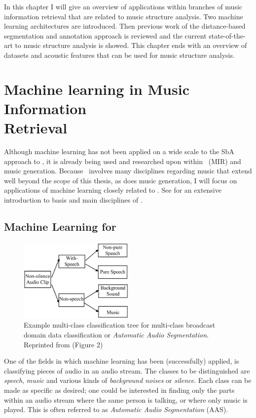 In this chapter I will give an overview of applications within branches of music information retrieval that are related to music structure analysis. Two machine learning architectures are introduced. Then previous work of the distance-based segmentation and annotation approach is reviewed and the current state-of-the-art to music structure analysis is showed. This chapter ends with an overview of datasets and acoustic features that can be used for music structure analysis. 


\section[ML in MIR]{Machine learning in Music Information\\Retrieval}
Although machine learning has not been applied on a wide scale to the SbA approach to \msa, it is already being used and researched upon within \mir\ (MIR) and music generation. Because \mir\ involves many disciplines regarding music that extend well beyond the scope of this thesis, as does music generation, I will focus on applications of machine learning closely related to \msa. See  \cite{Muller} for an extensive introduction to basis and main disciplines of \mir.

\subsection[ML for AAS]{Machine Learning for \aas}
\begin{figure}[t]
    \centering
    \includegraphics[width=0.5\textwidth]{images/broadcast_classification}
    \caption{Example multi-class classification tree for multi-class broadcast domain data classification or \textit{Automatic Audio Segmentation}.\\
    Reprinted from \textcite{Lu2001content} (Figure 2)}
    \label{fig:broadcast_classification}
\end{figure}
One of the fields in which machine learning has been (successfully) applied, is classifying pieces of audio in an audio stream. The classes to be distinguished are \textit{speech}, \textit{music} and various kinds of \textit{background noises} or \textit{silence}. Each class can be made as specific as desired; one could be interested in finding only the parts within an audio stream where the same person is talking, or where only music is played. This is often referred to as \textit{Automatic Audio Segmentation} (AAS). 

